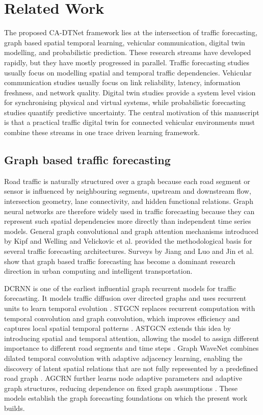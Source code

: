 \documentclass[pdflatex,sn-mathphys-num]{sn-jnl}%
\theoremstyle{thmstyleone}%
\theoremstyle{thmstyletwo}%
\theoremstyle{thmstylethree}%
\begin{document}
\section{Related Work}
\label{sec:related_work}

The proposed CA-DTNet framework lies at the intersection of traffic forecasting, graph based spatial temporal learning, vehicular communication, digital twin modelling, and probabilistic prediction. These research streams have developed rapidly, but they have mostly progressed in parallel. Traffic forecasting studies usually focus on modelling spatial and temporal traffic dependencies. Vehicular communication studies usually focus on link reliability, latency, information freshness, and network quality. Digital twin studies provide a system level vision for synchronising physical and virtual systems, while probabilistic forecasting studies quantify predictive uncertainty. The central motivation of this manuscript is that a practical traffic digital twin for connected vehicular environments must combine these streams in one trace driven learning framework.

\subsection{Graph based traffic forecasting}

Road traffic is naturally structured over a graph because each road segment or sensor is influenced by neighbouring segments, upstream and downstream flow, intersection geometry, lane connectivity, and hidden functional relations. Graph neural networks are therefore widely used in traffic forecasting because they can represent such spatial dependencies more directly than independent time series models. General graph convolutional and graph attention mechanisms introduced by Kipf and Welling \cite{kipf2017gcn} and Velickovic et al. \cite{velickovic2018gat} provided the methodological basis for several traffic forecasting architectures. Surveys by Jiang and Luo \cite{jiang2022gnnsurvey} and Jin et al. \cite{jin2023stgnnsurvey} show that graph based traffic forecasting has become a dominant research direction in urban computing and intelligent transportation.

DCRNN is one of the earliest influential graph recurrent models for traffic forecasting. It models traffic diffusion over directed graphs and uses recurrent units to learn temporal evolution \cite{li2018dcrnn}. STGCN replaces recurrent computation with temporal convolution and graph convolution, which improves efficiency and captures local spatial temporal patterns \cite{yu2018stgcn}. ASTGCN extends this idea by introducing spatial and temporal attention, allowing the model to assign different importance to different road segments and time steps \cite{guo2019astgcn}. Graph WaveNet combines dilated temporal convolution with adaptive adjacency learning, enabling the discovery of latent spatial relations that are not fully represented by a predefined road graph \cite{wu2019graphwavenet}. AGCRN further learns node adaptive parameters and adaptive graph structures, reducing dependence on fixed graph assumptions \cite{bai2020agcrn}. These models establish the graph forecasting foundations on which the present work builds.
\end{document}
